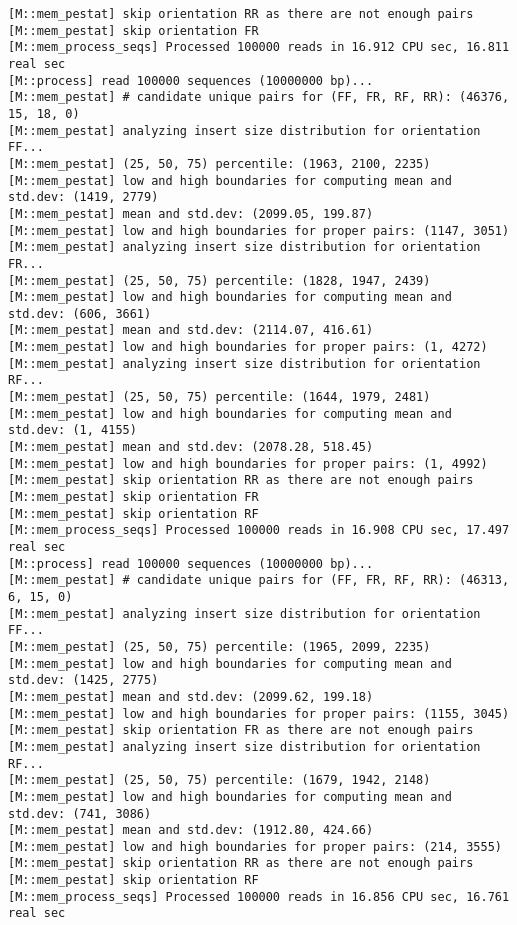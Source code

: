 \begin{lstlisting}
[M::mem_pestat] skip orientation RR as there are not enough pairs
[M::mem_pestat] skip orientation FR
[M::mem_process_seqs] Processed 100000 reads in 16.912 CPU sec, 16.811 real sec
[M::process] read 100000 sequences (10000000 bp)...
[M::mem_pestat] # candidate unique pairs for (FF, FR, RF, RR): (46376, 15, 18, 0)
[M::mem_pestat] analyzing insert size distribution for orientation FF...
[M::mem_pestat] (25, 50, 75) percentile: (1963, 2100, 2235)
[M::mem_pestat] low and high boundaries for computing mean and std.dev: (1419, 2779)
[M::mem_pestat] mean and std.dev: (2099.05, 199.87)
[M::mem_pestat] low and high boundaries for proper pairs: (1147, 3051)
[M::mem_pestat] analyzing insert size distribution for orientation FR...
[M::mem_pestat] (25, 50, 75) percentile: (1828, 1947, 2439)
[M::mem_pestat] low and high boundaries for computing mean and std.dev: (606, 3661)
[M::mem_pestat] mean and std.dev: (2114.07, 416.61)
[M::mem_pestat] low and high boundaries for proper pairs: (1, 4272)
[M::mem_pestat] analyzing insert size distribution for orientation RF...
[M::mem_pestat] (25, 50, 75) percentile: (1644, 1979, 2481)
[M::mem_pestat] low and high boundaries for computing mean and std.dev: (1, 4155)
[M::mem_pestat] mean and std.dev: (2078.28, 518.45)
[M::mem_pestat] low and high boundaries for proper pairs: (1, 4992)
[M::mem_pestat] skip orientation RR as there are not enough pairs
[M::mem_pestat] skip orientation FR
[M::mem_pestat] skip orientation RF
[M::mem_process_seqs] Processed 100000 reads in 16.908 CPU sec, 17.497 real sec
[M::process] read 100000 sequences (10000000 bp)...
[M::mem_pestat] # candidate unique pairs for (FF, FR, RF, RR): (46313, 6, 15, 0)
[M::mem_pestat] analyzing insert size distribution for orientation FF...
[M::mem_pestat] (25, 50, 75) percentile: (1965, 2099, 2235)
[M::mem_pestat] low and high boundaries for computing mean and std.dev: (1425, 2775)
[M::mem_pestat] mean and std.dev: (2099.62, 199.18)
[M::mem_pestat] low and high boundaries for proper pairs: (1155, 3045)
[M::mem_pestat] skip orientation FR as there are not enough pairs
[M::mem_pestat] analyzing insert size distribution for orientation RF...
[M::mem_pestat] (25, 50, 75) percentile: (1679, 1942, 2148)
[M::mem_pestat] low and high boundaries for computing mean and std.dev: (741, 3086)
[M::mem_pestat] mean and std.dev: (1912.80, 424.66)
[M::mem_pestat] low and high boundaries for proper pairs: (214, 3555)
[M::mem_pestat] skip orientation RR as there are not enough pairs
[M::mem_pestat] skip orientation RF
[M::mem_process_seqs] Processed 100000 reads in 16.856 CPU sec, 16.761 real sec

\end{lstlisting}
